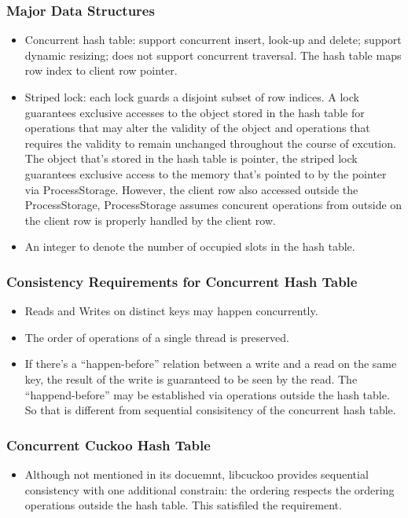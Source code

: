 \documentclass{beamer}
\begin{document}
\begin{frame}
\frametitle{Major Data Structures}
\begin{itemize}
\item Concurrent hash table: support concurrent insert, look-up and delete; 
support dynamic resizing; does not support concurrent traversal. The hash table
maps row index to client row pointer.
\item Striped lock: each lock guards a disjoint subset of row indices. A lock 
guarantees exclusive accesses to the object stored in the hash table for operations
that may alter the validity of the object and operations that requires the validity 
to remain unchanged throughout the course of excution. The object that's 
stored in the hash table is pointer, the striped lock guarantees exclusive 
access to the memory that's pointed to by the pointer via ProcessStorage. However,
the client row also accessed outside the ProcessStorage, ProcessStorage assumes
concurent operations from outside on the client row is properly handled by the client 
row.
\item An integer to denote the number of occupied slots in the hash table.
\end{itemize}
\end{frame}

\begin{frame}
\frametitle{Consistency Requirements for Concurrent Hash Table}
\begin{itemize}
\item Reads and Writes on distinct keys may happen concurrently.
\item The order of operations of a single thread is preserved.
\item If there's a ``happen-before'' relation between a write and a read on the 
  same key, the result of the write is guaranteed to be seen by the read. The 
``happend-before'' may be established via operations outside the hash table. So 
that is different from sequential consisitency of the concurrent hash table.
\end{itemize}
\end{frame}

\begin{frame}
\frametitle{Concurrent Cuckoo Hash Table}
\begin{itemize}
\item Although not mentioned in its docuemnt, libcuckoo provides sequential 
consistency with one additional constrain: the ordering respects the ordering
operations outside the hash table. This satisfiled the requirement.
\end{itemize}
\end{frame}
\end{document}
